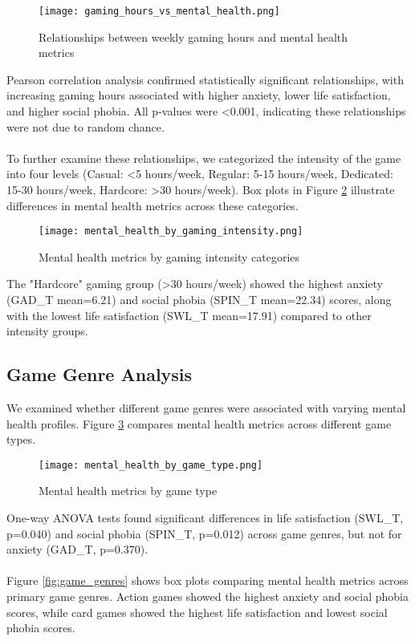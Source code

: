\documentclass[12pt]{article}
\begin{document}
\begin{figure}[H]
\centering
\texttt{[image: gaming\_hours\_vs\_mental\_health.png]}
\caption{Relationships between weekly gaming hours and mental health metrics}
\label{fig:gaming_hours}
\end{figure}
\noindent
Pearson correlation analysis confirmed statistically significant relationships, with increasing gaming hours associated with higher anxiety, lower life satisfaction, and higher social phobia. All p-values were \textless 0.001, indicating these relationships were not due to random chance. \\
\\
To further examine these relationships, we categorized the intensity of the game into four levels (Casual: \textless 5 hours/week, Regular: 5-15 hours/week, Dedicated: 15-30 hours/week, Hardcore: \textgreater 30 hours/week). Box plots in Figure \ref{fig:gaming_intensity} illustrate differences in mental health metrics across these categories.

\begin{figure}[H]
\centering
\texttt{[image: mental\_health\_by\_gaming\_intensity.png]}
\caption{Mental health metrics by gaming intensity categories}
\label{fig:gaming_intensity}
\end{figure}
\noindent
The "Hardcore" gaming group (\textgreater 30 hours/week) showed the highest anxiety (GAD\_T mean=6.21) and social phobia (SPIN\_T mean=22.34) scores, along with the lowest life satisfaction (SWL\_T mean=17.91) compared to other intensity groups.

\subsection{Game Genre Analysis}

We examined whether different game genres were associated with varying mental health profiles. Figure \ref{fig:game_type} compares mental health metrics across different game types.

\begin{figure}[H]
\centering
\texttt{[image: mental\_health\_by\_game\_type.png]}
\caption{Mental health metrics by game type}
\label{fig:game_type}
\end{figure}
\noindent
One-way ANOVA tests found significant differences in life satisfaction (SWL\_T, p=0.040) and social phobia (SPIN\_T, p=0.012) across game genres, but not for anxiety (GAD\_T, p=0.370). \\
\\
Figure \ref{fig:game_genres} shows box plots comparing mental health metrics across primary game genres. Action games showed the highest anxiety and social phobia scores, while card games showed the highest life satisfaction and lowest social phobia scores.
\end{document}
